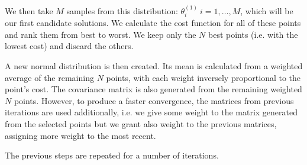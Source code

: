 We then take $M$ samples from this distribution: $\theta^{(1)}_i\ i=1,\ldots,M$, which will be our first candidate solutions. We calculate the cost function for all of these points and rank them from best to worst. We keep only the $N$ best points (i.e. with the lowest cost) and discard the others.

A new normal distribution is then created. Its mean is calculated from a weighted average of the remaining $N$ points, with each weight inversely proportional to the point's cost. The covariance matrix is also generated from the remaining weighted $N$ points. However, to produce a faster convergence, the matrices from previous iterations are used additionally, i.e. we give some weight to the matrix generated from the selected points but we grant also weight to the previous matrices, assigning more weight to the most recent.

The previous steps are repeated for a number of iterations.
\fi




